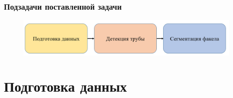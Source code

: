 \documentclass[t]{beamer}
\begin{document}
	\begin{frame}
		\frametitle{Подзадачи поставленной задачи} 
		\vspace{1.8cm}
		\begin{figure}
			\centering
			\includegraphics[width = \textwidth]{image/scheme2_upd}	
		\end{figure}
	\end{frame}

\section{Подготовка данных}

\end{document}
